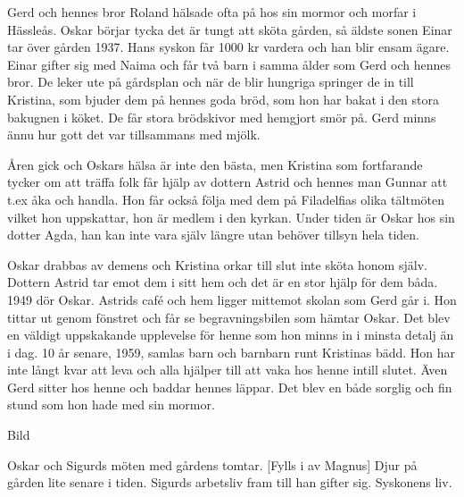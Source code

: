 Gerd och hennes bror Roland hälsade ofta på hos sin mormor och morfar i Hässleås. Oskar börjar tycka det är tungt att sköta gården, så äldste sonen Einar tar över gården 1937. Hans syskon får 1000 kr vardera och han blir ensam ägare. Einar gifter sig med Naima  och får två barn i samma ålder som Gerd och hennes bror. De leker ute på gårdsplan och när de blir hungriga springer de in till Kristina, som bjuder dem på hennes goda bröd, som hon har bakat i den stora bakugnen i köket. De får stora brödskivor med hemgjort smör på. Gerd minns ännu hur gott det var tillsammans med mjölk.

Åren gick och Oskars hälsa är inte den bästa, men Kristina som fortfarande tycker om att träffa folk får hjälp av dottern Astrid och hennes man Gunnar att t.ex åka och handla. Hon får också följa med dem på Filadelfias olika tältmöten vilket hon uppskattar, hon är medlem i den kyrkan. Under tiden är Oskar hos sin dotter Agda, han kan inte vara själv längre utan behöver tillsyn hela tiden.

Oskar drabbas av demens och Kristina orkar till slut  inte sköta honom själv. Dottern Astrid tar emot dem i sitt hem och det är en stor hjälp för dem båda. 
1949 dör Oskar. Astrids café och hem ligger mittemot skolan som Gerd går i. Hon tittar ut genom fönstret  och får se begravningsbilen som hämtar Oskar. Det blev en väldigt uppskakande upplevelse för henne som hon minns in i minsta detalj än i dag.
10 år senare, 1959, samlas barn och barnbarn runt Kristinas bädd. Hon har inte långt kvar att leva och alla hjälper till att vaka hos henne intill slutet. Även Gerd sitter hos henne och baddar hennes läppar. Det blev en både sorglig och fin stund som hon hade med sin mormor.









Bild

Oskar och Sigurds möten med gårdens tomtar. [Fylls i av Magnus]
Djur på gården lite senare i tiden. Sigurds arbetsliv fram till han gifter sig. Syskonens liv.

